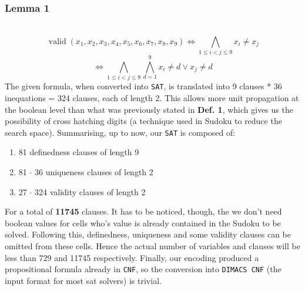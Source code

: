 \documentclass[paper=a4, fontsize=14pt]{scrartcl} %
\begin{document}
	\subsubsection*{Lemma 1} \\
	\[\operatorname{valid}\left(x_{1}, x_{2}, x_{3}, x_{4}, x_{5}, x_{6}, x_{7}, x_{8}, x_{9}\right) \Longleftrightarrow \bigwedge_{1 \leq i<j \leq 9} x_{i} \neq x_{j}\]
	\[\Longleftrightarrow \bigwedge_{1 \leq i<j \leq 9} \bigwedge_{d=1}^{9} x_{i} \neq d \vee x_{j} \neq d\]
	\newline
The given formula, when converted into \texttt{SAT}, is translated into 9 clauses * 36 inequations = 324 clauses, each of length 2. This allows more unit propagation at the boolean level than what was previously stated in \textbf{Def. 1}, which gives us the possibility of cross hatching digits (a technique used in Sudoku to reduce the search space).
\newline
Summarising, up to now, our \texttt{SAT} is composed of:
	\begin{enumerate}
		\item 81 definedness clauses of length 9
		\item 81 $\cdot$ 36 uniqueness clauses of length 2
		\item 27 $\cdot$ 324 validity clauses of length 2
	\end{enumerate}
For a total of \textbf{11745} clauses.
\newline
It has to be noticed, though, the we don't need boolean values for cells who's value is already contained in the Sudoku to be solved. Following this, definedness, uniqueness and some validity clauses can be omitted from these cells. Hence the actual number of variables and clauses will be less than 729 and 11745 respectively.
\newline
Finally, our encoding produced a propositional formula already in \texttt{CNF}, so the conversion into \texttt{DIMACS CNF} (the input format for most sat solvers) is trivial.
\end{document}
